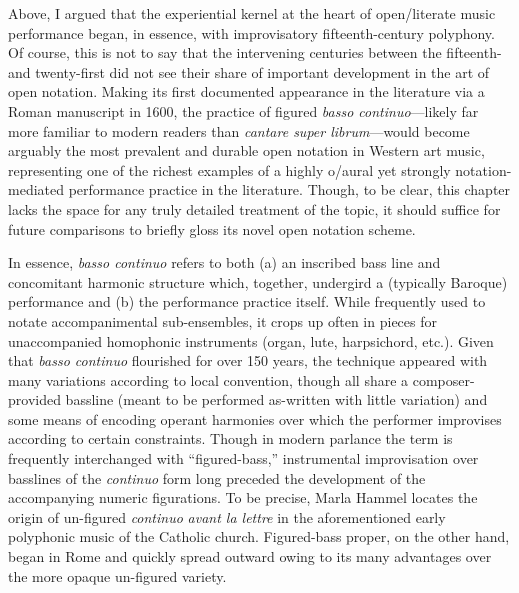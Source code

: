      Above, I argued that the experiential kernel at the heart of open/literate music performance began, in essence, with improvisatory fifteenth-century polyphony. Of course, this is not to say that the intervening centuries between the fifteenth- and twenty-first did not see their share of important development in the art of open notation. Making its first documented appearance in the literature via a Roman manuscript in 1600, the practice of figured \textit{basso continuo}---likely far more familiar to modern readers than \textit{cantare super librum}---would become arguably the most prevalent and durable open notation in Western art music, representing one of the richest examples of a highly o/aural yet strongly notation-mediated performance practice in the literature.\autocite[811]{Taruskin_2009} Though, to be clear, this chapter lacks the space for any truly detailed treatment of the topic, it should suffice for future comparisons to briefly gloss its novel open notation scheme.

    In essence, \textit{basso continuo} refers to both (a) an inscribed bass line and concomitant harmonic structure which, together, undergird a (typically Baroque) performance and (b) the performance practice itself. While frequently used to notate accompanimental sub-ensembles, it crops up often in pieces for unaccompanied homophonic instruments (organ, lute, harpsichord, etc.). Given that \textit{basso continuo} flourished for over 150 years, the technique appeared with many variations according to local convention, though all share a composer-provided bassline (meant to be performed as-written with little variation) and some means of encoding operant harmonies over which the performer improvises according to certain constraints. Though in modern parlance the term is frequently interchanged with ``figured-bass,'' instrumental improvisation over basslines of the \textit{continuo} form long preceded the development of the accompanying numeric figurations. To be precise, Marla Hammel locates the origin of un-figured \textit{continuo} \textit{avant la lettre} in the aforementioned early polyphonic music of the Catholic church. Figured-bass proper, on the other hand, began in Rome and quickly spread outward owing to its many advantages over the more opaque un-figured variety.\autocite[28--9]{Hammel_1977}

